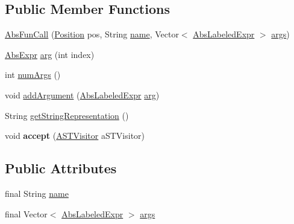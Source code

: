 \subsection*{Public Member Functions}
\begin{DoxyCompactItemize}
\item 
\hyperlink{classcompiler_1_1abstr_1_1tree_1_1expr_1_1_abs_fun_call_ae926c7e2f49eb5a93cd0d65223d65c57}{Abs\+Fun\+Call} (\hyperlink{classcompiler_1_1_position}{Position} pos, String \hyperlink{classcompiler_1_1abstr_1_1tree_1_1expr_1_1_abs_fun_call_aa9a892390ef5c6cdc31ed3b47ebe0df7}{name}, Vector$<$ \hyperlink{classcompiler_1_1abstr_1_1tree_1_1expr_1_1_abs_labeled_expr}{Abs\+Labeled\+Expr} $>$ \hyperlink{classcompiler_1_1abstr_1_1tree_1_1expr_1_1_abs_fun_call_a47d184725dcf5f4357af2b228859e35a}{args})
\item 
\hyperlink{classcompiler_1_1abstr_1_1tree_1_1expr_1_1_abs_expr}{Abs\+Expr} \hyperlink{classcompiler_1_1abstr_1_1tree_1_1expr_1_1_abs_fun_call_a10e0032d16fee0d22089c0726b2c3702}{arg} (int index)
\item 
int \hyperlink{classcompiler_1_1abstr_1_1tree_1_1expr_1_1_abs_fun_call_aa28663eb06c877f1e1a65029c302622d}{num\+Args} ()
\item 
void \hyperlink{classcompiler_1_1abstr_1_1tree_1_1expr_1_1_abs_fun_call_a6ec36d7ce4682de6f654f4f71775b1e0}{add\+Argument} (\hyperlink{classcompiler_1_1abstr_1_1tree_1_1expr_1_1_abs_labeled_expr}{Abs\+Labeled\+Expr} \hyperlink{classcompiler_1_1abstr_1_1tree_1_1expr_1_1_abs_fun_call_a10e0032d16fee0d22089c0726b2c3702}{arg})
\item 
String \hyperlink{classcompiler_1_1abstr_1_1tree_1_1expr_1_1_abs_fun_call_a98325b2c183df4b1f7f1a3697facc8ab}{get\+String\+Representation} ()
\item 
\mbox{\label{classcompiler_1_1abstr_1_1tree_1_1expr_1_1_abs_fun_call_ab39a3e6118715926333bcd9b665f75d8}} 
void {\bfseries accept} (\hyperlink{interfacecompiler_1_1abstr_1_1_a_s_t_visitor}{A\+S\+T\+Visitor} a\+S\+T\+Visitor)
\end{DoxyCompactItemize}
\subsection*{Public Attributes}
\begin{DoxyCompactItemize}
\item 
final String \hyperlink{classcompiler_1_1abstr_1_1tree_1_1expr_1_1_abs_fun_call_aa9a892390ef5c6cdc31ed3b47ebe0df7}{name}
\item 
final Vector$<$ \hyperlink{classcompiler_1_1abstr_1_1tree_1_1expr_1_1_abs_labeled_expr}{Abs\+Labeled\+Expr} $>$ \hyperlink{classcompiler_1_1abstr_1_1tree_1_1expr_1_1_abs_fun_call_a47d184725dcf5f4357af2b228859e35a}{args}
\end{DoxyCompactItemize}


